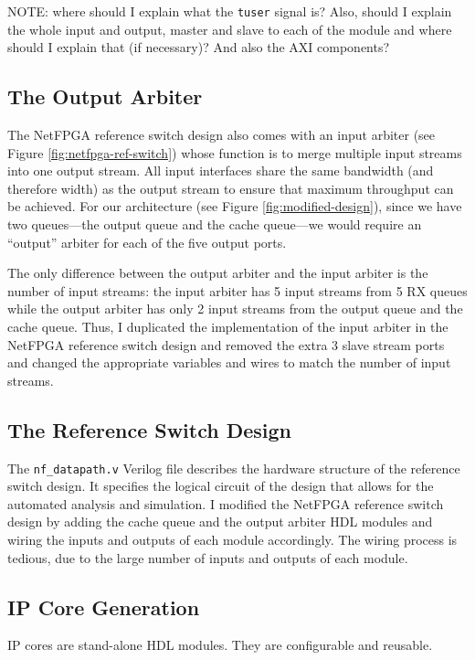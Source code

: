 NOTE: where should I explain what the \texttt{tuser} signal is? Also, should I explain the whole input and output, master and slave to each of the module and where should I explain that (if necessary)? And also the AXI components?

	\subsection{The Output Arbiter}
	
The NetFPGA reference switch design also comes with an input arbiter (see Figure \ref{fig:netfpga-ref-switch}) whose function is to merge multiple input streams into one output stream. All input interfaces share the same bandwidth (and therefore width) as the output stream to ensure that maximum throughput can be achieved. For our architecture (see Figure \ref{fig:modified-design}), since we have two queues---the output queue and the cache queue---we would require an ``output'' arbiter for each of the five output ports. 

The only difference between the output arbiter and the input arbiter is the number of input streams: the input arbiter has 5 input streams from 5 RX queues while the output arbiter has only 2 input streams from the output queue and the cache queue. Thus, I duplicated the implementation of the input arbiter in the NetFPGA reference switch design and removed the extra 3 slave stream ports and changed the appropriate variables and wires to match the number of input streams.

	\subsection{The Reference Switch Design}

The \verb|nf_datapath.v| Verilog file describes the hardware structure of the reference switch design. It specifies the logical circuit of the design that allows for the automated analysis and simulation. I modified the NetFPGA reference switch design by adding the cache queue and the output arbiter HDL modules and wiring the inputs and outputs of each module accordingly. The wiring process is tedious, due to the large number of inputs and outputs of each module.
	
	\subsection{IP Core Generation}
IP cores are stand-alone HDL modules. They are configurable and reusable.